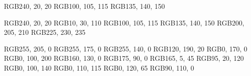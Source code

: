 
\usepackage[
	Internship,
]{optional}
 

\newcommand{\activateConfidentialityClause}{def}


	\setdefaultlanguage[variant=german, latesthyphen=true]{german}


\newcommand{\studentname}{...}
\newcommand{\matrikelno}{...}
\newcommand{\kurs}{MA-TINF...}

\newcommand{\companyname}{DB Systel GmbH}
\newcommand{\companylocation}{Frankfurt am Main}

\newcommand{\studiengang}{Angewandte Informatik}
\newcommand{\dhbwDE}{Duale Hochschule Baden-Württemberg Mannheim}
\newcommand{\dhbwEN}{Baden-Wuerttemberg Cooperative State University Mannheim}

\newcommand{\reporttitle}{...}

\newcommand{\timerange}{... Wochen}
\newcommand{\handoverdate}{01.01.1970}
\newcommand{\city}{...}




\definecolor{PrimaryAccentColor}  	{RGB}{240, 20, 20}
\definecolor{SecondaryAccentColor}	{RGB}{100, 105, 115}
\definecolor{TertiaryAccentColor} 	{RGB}{135, 140, 150}

\definecolor{DbRot}     		{RGB}{240, 20, 20}
\definecolor{DbBlau}     		{RGB}{10, 30, 110}
\definecolor{DbDunkelgrau}	{RGB}{100, 105, 115}
\definecolor{DbGrau}     		{RGB}{135, 140, 150}
\definecolor{DbHellgrau}     	{RGB}{200, 205, 210}
\definecolor{DbWeissgrau}     	{RGB}{225, 230, 235}

\definecolor{DbGelb}     		{RGB}{255, 205, 0}
\definecolor{DbSonnengelb}     	{RGB}{255, 175, 0}
\definecolor{DbVerkehrsorange}	{RGB}{255, 140, 0}
\definecolor{DbGelbgruen}     	{RGB}{120, 190, 20}
\definecolor{DbGrasgruen}     	{RGB}{0, 170, 0}
\definecolor{DbSignalblau}     	{RGB}{0, 100, 200}
\definecolor{DbCurrygelb}     	{RGB}{160, 130, 0}
\definecolor{DbOrangebraun}   	{RGB}{175, 90, 0}
\definecolor{DbRubinrot}     	{RGB}{165, 5, 45}
\definecolor{DbPurpurviolett}  	{RGB}{95, 20, 120}
\definecolor{DbVerkehrsblau}  	{RGB}{0, 100, 140}
\definecolor{DbOpalgruen}     	{RGB}{0, 110, 115}
\definecolor{DbTuerkisgruen}  	{RGB}{0, 120, 65}
\definecolor{DbFarngruen}     	{RGB}{90, 110, 0}


